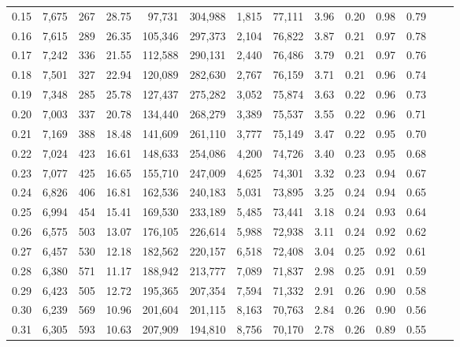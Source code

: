 \begin{tabular}{rrrrrrrrrrrrrr}
0.15 &  7,675 &    267 &   28.75 &   97,731 &  304,988 &   1,815 &  77,111 &  3.96 &  0.20 &  0.98 &      0.79 \\
0.16 &  7,615 &    289 &   26.35 &  105,346 &  297,373 &   2,104 &  76,822 &  3.87 &  0.21 &  0.97 &      0.78 \\
0.17 &  7,242 &    336 &   21.55 &  112,588 &  290,131 &   2,440 &  76,486 &  3.79 &  0.21 &  0.97 &      0.76 \\
0.18 &  7,501 &    327 &   22.94 &  120,089 &  282,630 &   2,767 &  76,159 &  3.71 &  0.21 &  0.96 &      0.74 \\
0.19 &  7,348 &    285 &   25.78 &  127,437 &  275,282 &   3,052 &  75,874 &  3.63 &  0.22 &  0.96 &      0.73 \\
0.20 &  7,003 &    337 &   20.78 &  134,440 &  268,279 &   3,389 &  75,537 &  3.55 &  0.22 &  0.96 &      0.71 \\
0.21 &  7,169 &    388 &   18.48 &  141,609 &  261,110 &   3,777 &  75,149 &  3.47 &  0.22 &  0.95 &      0.70 \\
0.22 &  7,024 &    423 &   16.61 &  148,633 &  254,086 &   4,200 &  74,726 &  3.40 &  0.23 &  0.95 &      0.68 \\
0.23 &  7,077 &    425 &   16.65 &  155,710 &  247,009 &   4,625 &  74,301 &  3.32 &  0.23 &  0.94 &      0.67 \\
0.24 &  6,826 &    406 &   16.81 &  162,536 &  240,183 &   5,031 &  73,895 &  3.25 &  0.24 &  0.94 &      0.65 \\
0.25 &  6,994 &    454 &   15.41 &  169,530 &  233,189 &   5,485 &  73,441 &  3.18 &  0.24 &  0.93 &      0.64 \\
0.26 &  6,575 &    503 &   13.07 &  176,105 &  226,614 &   5,988 &  72,938 &  3.11 &  0.24 &  0.92 &      0.62 \\
0.27 &  6,457 &    530 &   12.18 &  182,562 &  220,157 &   6,518 &  72,408 &  3.04 &  0.25 &  0.92 &      0.61 \\
0.28 &  6,380 &    571 &   11.17 &  188,942 &  213,777 &   7,089 &  71,837 &  2.98 &  0.25 &  0.91 &      0.59 \\
0.29 &  6,423 &    505 &   12.72 &  195,365 &  207,354 &   7,594 &  71,332 &  2.91 &  0.26 &  0.90 &      0.58 \\
0.30 &  6,239 &    569 &   10.96 &  201,604 &  201,115 &   8,163 &  70,763 &  2.84 &  0.26 &  0.90 &      0.56 \\
0.31 &  6,305 &    593 &   10.63 &  207,909 &  194,810 &   8,756 &  70,170 &  2.78 &  0.26 &  0.89 &      0.55 \\

\end{tabular}
